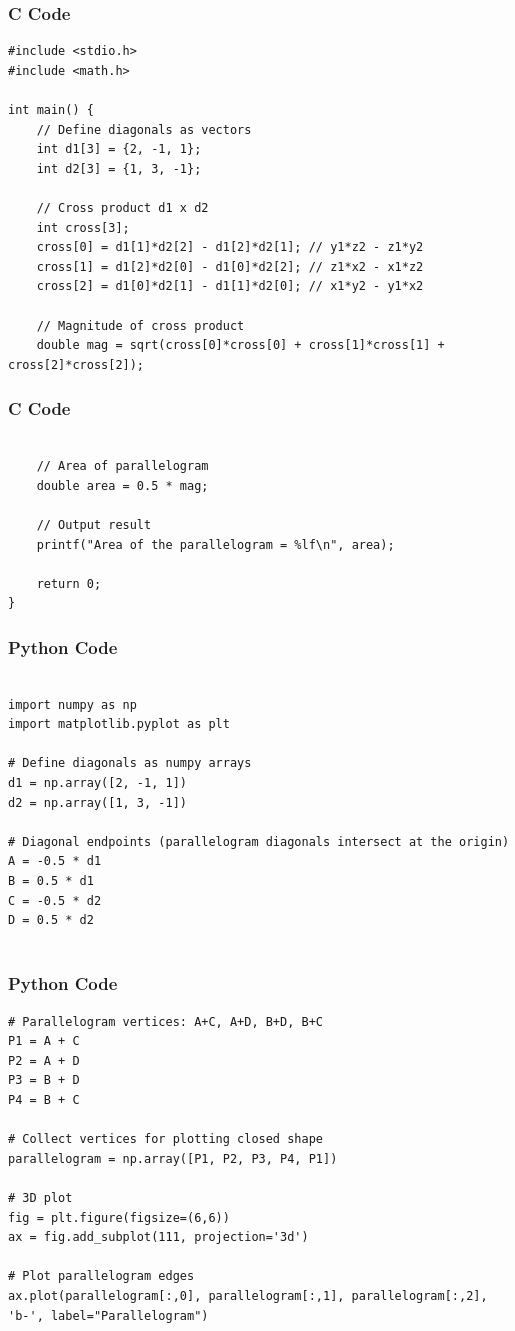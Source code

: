 \documentclass{beamer}
\begin{document}
\begin{frame}[fragile]
    \frametitle{C Code}
    \begin{lstlisting}
#include <stdio.h>
#include <math.h>

int main() {
    // Define diagonals as vectors
    int d1[3] = {2, -1, 1};
    int d2[3] = {1, 3, -1};

    // Cross product d1 x d2
    int cross[3];
    cross[0] = d1[1]*d2[2] - d1[2]*d2[1]; // y1*z2 - z1*y2
    cross[1] = d1[2]*d2[0] - d1[0]*d2[2]; // z1*x2 - x1*z2
    cross[2] = d1[0]*d2[1] - d1[1]*d2[0]; // x1*y2 - y1*x2

    // Magnitude of cross product
    double mag = sqrt(cross[0]*cross[0] + cross[1]*cross[1] + cross[2]*cross[2]);

    \end{lstlisting}
\end{frame}

\begin{frame}[fragile]
    \frametitle{C Code}
    \begin{lstlisting}

    // Area of parallelogram
    double area = 0.5 * mag;

    // Output result
    printf("Area of the parallelogram = %lf\n", area);

    return 0;
}

    \end{lstlisting}
\end{frame}

\begin{frame}[fragile]
    \frametitle{Python Code}
    \begin{lstlisting}
    
import numpy as np
import matplotlib.pyplot as plt

# Define diagonals as numpy arrays
d1 = np.array([2, -1, 1])
d2 = np.array([1, 3, -1])

# Diagonal endpoints (parallelogram diagonals intersect at the origin)
A = -0.5 * d1
B = 0.5 * d1
C = -0.5 * d2
D = 0.5 * d2


    \end{lstlisting}
\end{frame}

\begin{frame}[fragile]
    \frametitle{Python Code}
    \begin{lstlisting}
# Parallelogram vertices: A+C, A+D, B+D, B+C
P1 = A + C
P2 = A + D
P3 = B + D
P4 = B + C

# Collect vertices for plotting closed shape
parallelogram = np.array([P1, P2, P3, P4, P1])

# 3D plot
fig = plt.figure(figsize=(6,6))
ax = fig.add_subplot(111, projection='3d')

# Plot parallelogram edges
ax.plot(parallelogram[:,0], parallelogram[:,1], parallelogram[:,2], 'b-', label="Parallelogram")


    \end{lstlisting}
\end{frame}
\end{document}
